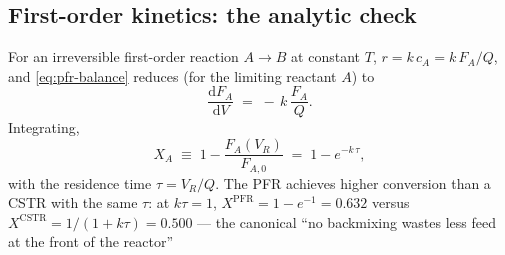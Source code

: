 \documentclass[11pt,a4paper]{article}
\begin{document}
\subsection{First-order kinetics: the analytic check}

For an irreversible first-order reaction $A \to B$ at constant $T$,
$r = k \, c_A = k \, F_A / Q$, and \eqref{eq:pfr-balance} reduces
(for the limiting reactant $A$) to
\begin{equation}
   \frac{\mathrm{d}F_A}{\mathrm{d}V} \;=\; -\,k\,\frac{F_A}{Q}.
\end{equation}
Integrating,
\begin{equation}
   \boxed{\;
   X_A \;\equiv\; 1 - \frac{F_A(V_R)}{F_{A,0}}
                \;=\; 1 - e^{-k \, \tau},
   \;}
   \label{eq:pfr-X-firstorder}
\end{equation}
with the residence time $\tau = V_R/Q$. The PFR achieves higher
conversion than a CSTR with the same $\tau$: at $k\tau = 1$,
$X^{\text{PFR}} = 1 - e^{-1} = 0.632$ versus
$X^{\text{CSTR}} = 1/(1 + k\tau) = 0.500$ --- the canonical
``no backmixing wastes less feed at the front of the reactor''
\end{document}
